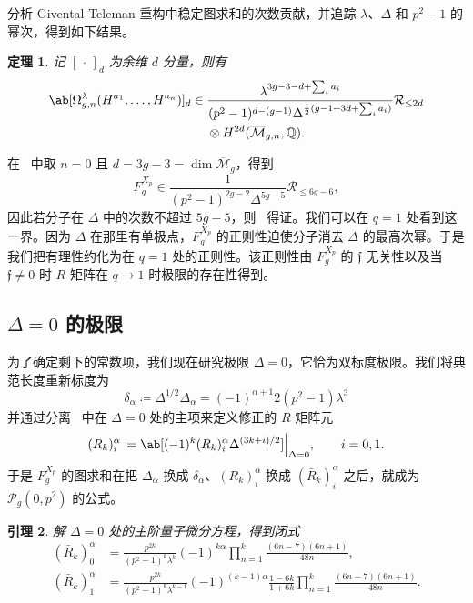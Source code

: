 \documentclass{amsart}
\newtheorem{thm}{定理}[section]
\newtheorem{lem}[thm]{引理}
\theoremstyle{definition}
\theoremstyle{remark}
\theoremstyle{plain}
\theoremstyle{definition}
\theoremstyle{remark}
\newcommand{\Q}{\mathbb{Q}}
\newcommand{\Mbar}{\overline{\mathcal{M}}}
\newcommand{\mc}[1]{\mathcal{#1}}
\newcommand{\mf}[1]{\mathfrak{#1}}
\newcommand{\1}{\mathbf{1}}
\newcommand{\2}{\mathbf{2}}
\newcommand{\3}{\mathbf{3}}
\begin{document}
分析 Givental-Teleman 重构中稳定图求和的次数贡献，并追踪 \(\lambda\)、\(\Delta\) 和 \(p^2-1\) 的幂次，得到如下结果。

\begin{thm}%
\label{thm:local P1 reconstruction}
    记 \([\,\cdot\,]_d\) 为余维 \(d\) 分量，则有
    \begin{align*}
        \ab[\Omega^{\lambda}_{g,n}(H^{a_1},\ldots,H^{a_n})]_d \in{}& \frac{\lambda^{3g-3-d+\sum_i a_i}}{(p^2-1)^{d-(g-1)}\Delta^{\frac{1}{2}(g-1+3d+\sum_i a_i)}}\mc{R}_{\leq 2d} \\
        &\otimes H^{2d}(\Mbar_{g,n},\Q).
    \end{align*}
\end{thm}

在~ 中取 \(n=0\) 且 \(d = 3g-3 = \dim \Mbar_g\)，得到
\[ F_g^{X_p} \in \frac{1}{(p^2-1)^{2g-2}\Delta^{5g-5}}\mc{R}_{\leq 6g-6}, \]
因此若分子在 \(\Delta\) 中的次数不超过 \(5g-5\)，则~ 得证。我们可以在 \(q=1\) 处看到这一界。因为 \(\Delta\) 在那里有单极点，\(F_g^{X_p}\) 的正则性迫使分子消去 \(\Delta\) 的最高次幂。于是我们把有理性约化为在 \(q=1\) 处的正则性。该正则性由 \(F_g^{X_p}\) 的 \(\mf{f}\) 无关性以及当 \(\mf{f} \neq 0\) 时 \(R\) 矩阵在 \(q \to 1\) 时极限的存在性得到。

\subsection{\(\Delta = 0\) 的极限}%
\label{sub:The limit Delta = 0}

为了确定剩下的常数项，我们现在研究极限 \(\Delta = 0\)，它恰为双标度极限。我们将典范长度重新标度为
\[ \delta_{\alpha} \coloneqq \Delta^{1/2}\Delta_{\alpha} = (-1)^{\alpha+1}2(p^2-1)\lambda^3 \]
并通过分离~ 中在 \(\Delta = 0\) 处的主项来定义修正的 \(R\) 矩阵元
\[ (\bar{R}_k)_i^{\alpha} \coloneqq \ab[(-1)^k (R_k)_i^{\alpha}\Delta^{(3k+i)/2}]\Big|_{\Delta=0}, \qquad i = 0,1. \]
于是 \(F_g^{X_p}\) 的图求和在把 \(\Delta_{\alpha}\) 换成 \(\delta_{\alpha}\)、\((R_k)_i^{\alpha}\) 换成 \((\bar{R}_k)_i^{\alpha}\) 之后，就成为 \(\mc{P}_g(0,p^2)\) 的公式。

\begin{lem}%
\label{lem:R matrix at Delta zero}
    解 \(\Delta = 0\) 处的主阶量子微分方程，得到闭式
    \begin{align*}
        (\bar{R}_k)_0^{\alpha} &= \frac{p^{2k}}{(p^2-1)^k\lambda^k}(-1)^{k\alpha}\prod_{n=1}^k \frac{(6n-7)(6n+1)}{48n}, \\
        (\bar{R}_k)_1^{\alpha} &= \frac{p^{2k}}{(p^2-1)^k \lambda^{k-1}}(-1)^{(k-1)\alpha}\frac{1-6k}{1+6k}\prod_{n=1}^k \frac{(6n-7)(6n+1)}{48n}.
    \end{align*}
\end{lem}
\end{document}
